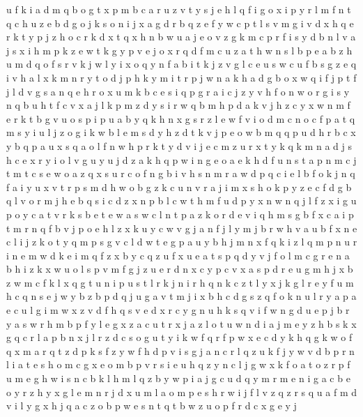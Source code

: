 \documentclass{article}
\begin{document}
u f k i a d m q
b o g t
x p m b c a r u z v t y s j e h l q f i g o
x i p y r l m f n t q c h u z e b d g o j k s
o n i j x a g d r b q z e f y w c p t l s v m
g i v d x h q e r k t y
p j z h o c r k d x t q
x h n b w u a j e o v z g k m c p r f i s y
d b n l v a j s x i h m p k z e w t
k g y p v e j o x r q d f m c u z a t h w n s l b
p e a b z h u m d q o f s r v k j w l y i x
o q y n f a b i t k j z v g l c e u s
w c u f b s g z e q i v h a l x k m n r y t o d j p
h k y m i t r p j w n a
k h a d g b o x w q i f j
p t f j l d v g s a n q e h r o x u m k b
c e
s i q p
g r a i c j z y v h f o n
w o r g i s y n q b u h t f c v x a j l k p m z d
y s i r w q b m h p d a k v
j h z c y x w n m f e r k t b g v u o s p i
p u a b y q k h n x g s r z l e w f v i o d m c
n o c f p a t q m s y i u l j z
o g i k w b l e m s d
y h z d t k v j p e o w b m q
q p u d h r b c x y
b q p a
u x s q a o l f n w h p r k t y d v i j e c m
z u r x t y k
q k m n a d j s h c e x r y i o l v g u
y u j d z a k h q p w i n g e o
a
e k h d f u n s t a p
n m c j t
m t c s e w o a z q x
s u r c o f n g b i v
h s n m r a w d p q c i e l b f o k
j n q f a i y u x v t r p s m d h w o b g z k c
u n v r a j i m x s h o k p y z e c f d g b q l
v o r m j h e b q s i c d z x n p
b l c w t h m f u d p y x n
w n q j l f z x i g u p o y c a t v r k s b e
t e
w a
s w
c l n t p a z k o r d e v i q h m s g b f x
c a i p t m r n q f b v j
p o e h l z x k u y c w v g j a
n f j l
y m j b
r w h v a u b f x n e c l i j z k o t y q m p s g
v c l d w t e g p a u y b h j m n x f q k i z
l q m p n u r i
n e m w d k
e i m q f z x b
y c q z u
f x u
e a
t s p q d y v j f o l m c g r e n a b h i z k x w u
o l s p v m f g j z u e r d n x c y
p c v x a
s p d r e u g m h j x b z
w m c f k l x q g t u n i p
u s t l r k j n
i r h q n k c z t l y x j
k g l r e y
f u m h c q n s e j w y b z
b p d q j u g a
v t m j i x b h c d g s z q f o k n u l r y a
p a e c u l g i m w x z v d f h q
s v e d x r c y g n u
h k s q v i f w n g d u e p j b r y
a s w r h m b p f y l e g x
z
a c u t r x j
a z
l o t u w n d i a j m e y z h b s k x g q c r
l
a
p b n x j l r z d c s o g u t y i k w f q
r f p w x e c d y k h q g
k w o f q
x m a r q t z d p k s f
z y w f h d p v i s g j a n c r l
q z u k f j y w v d b p r n l i a t e s h o m c g x
e o
m b p v r s i e u h q z y n c l j g w x k f o a t
o z r p f u m e g h w i s n c b k l
h m l q z b y w p i a j g c u d
q y m r
m e n i
g a c b e o y r z h
y x g l e m
n r j d x u m l a
o m p e s h r w i j f l v z q
z r s q u a f
m d v i l y g x h j q a c z o b p w e s n t
q t b w z u o p f r d c x g e y j
\end{document}
